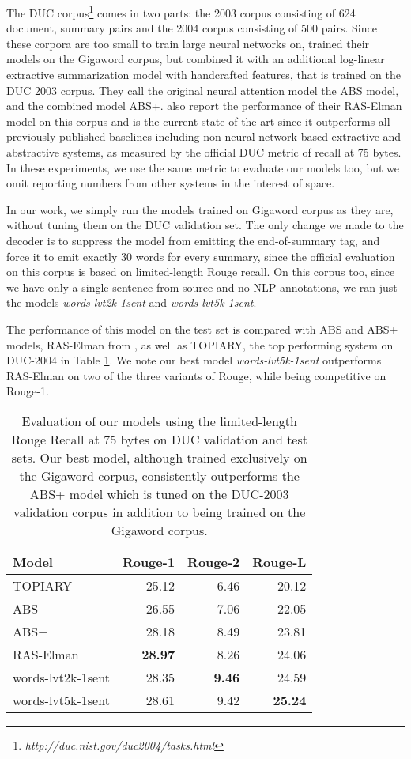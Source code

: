 \documentclass[11pt]{article}
\begin{document}
The DUC corpus\footnote{{\it http://duc.nist.gov/duc2004/tasks.html}} comes in two parts: the 2003 corpus consisting of 624 document, summary pairs and the 2004 corpus consisting of 500 pairs. Since these corpora are too small to train large neural networks on,  trained their models on the Gigaword corpus, but combined it with an additional log-linear extractive summarization model with handcrafted features, that is trained on the DUC 2003 corpus. They call the original neural attention model the ABS model, and the combined model ABS+.  also report the performance of their RAS-Elman model on this corpus and is the current state-of-the-art since it outperforms all previously published baselines including non-neural network based extractive and abstractive systems, as measured by the official DUC metric of recall at 75 bytes. In these experiments, we use the same metric to evaluate our models too, but we omit reporting numbers from other systems in the interest of space.

In our work, we simply run the models trained on Gigaword corpus as they are, without tuning them on the DUC validation set. The only change we made to the decoder is to suppress the model from emitting the end-of-summary tag, and force it to emit exactly 30 words for every summary, since the official evaluation on this corpus is based on limited-length Rouge recall. On this corpus too, since we have only a single sentence from source and no NLP annotations, we ran just the models {\it words-lvt2k-1sent} and {\it words-lvt5k-1sent}.

The performance of this model on the test set is compared with ABS and ABS+ models, RAS-Elman from \cite{chopra}, as well as TOPIARY, the top performing system on DUC-2004 in Table \ref{tab:duc}. We note our best model {\it words-lvt5k-1sent} outperforms RAS-Elman on two of the three variants of Rouge, while being competitive on Rouge-1.

\begin{table}[h]
\centering
{\small
\begin{tabular}{|l|r|r|r|}
\hline
Model & Rouge-1 & Rouge-2 & Rouge-L \\
\hline
TOPIARY & 25.12 & 6.46 & 20.12 \\
ABS &   26.55 & 7.06 & 22.05 \\
ABS+ &   28.18 & 8.49 & 23.81 \\
RAS-Elman & {\bf 28.97} & 8.26 & 24.06 \\
words-lvt2k-1sent &  28.35 & {\bf 9.46} & 24.59 \\
words-lvt5k-1sent & 28.61 & 9.42 &  {\bf 25.24} \\
\hline
\end{tabular}
}
\caption{{\small Evaluation of our models using the limited-length Rouge Recall  at 75 bytes on DUC validation and test sets. Our best model, although trained exclusively on the Gigaword corpus, consistently outperforms the ABS+ model which is tuned on the DUC-2003 validation corpus in addition to being trained on the Gigaword corpus.}}
\label{tab:duc}
\end{table}
\end{document}
